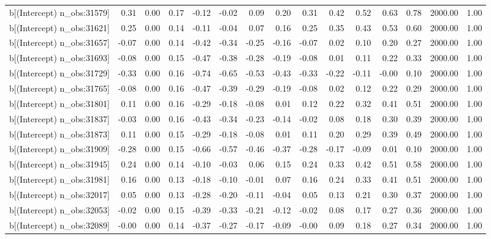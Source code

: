 \begin{table}[ht]
\begin{tabular}{rrrrrrrrrrrrrrr}
  b[(Intercept) n\_obs:31579] & 0.31 & 0.00 & 0.17 & -0.12 & -0.02 & 0.09 & 0.20 & 0.31 & 0.42 & 0.52 & 0.63 & 0.78 & 2000.00 & 1.00 \\ 
  b[(Intercept) n\_obs:31621] & 0.25 & 0.00 & 0.14 & -0.11 & -0.04 & 0.07 & 0.16 & 0.25 & 0.35 & 0.43 & 0.53 & 0.60 & 2000.00 & 1.00 \\ 
  b[(Intercept) n\_obs:31657] & -0.07 & 0.00 & 0.14 & -0.42 & -0.34 & -0.25 & -0.16 & -0.07 & 0.02 & 0.10 & 0.20 & 0.27 & 2000.00 & 1.00 \\ 
  b[(Intercept) n\_obs:31693] & -0.08 & 0.00 & 0.15 & -0.47 & -0.38 & -0.28 & -0.19 & -0.08 & 0.01 & 0.11 & 0.22 & 0.33 & 2000.00 & 1.00 \\ 
  b[(Intercept) n\_obs:31729] & -0.33 & 0.00 & 0.16 & -0.74 & -0.65 & -0.53 & -0.43 & -0.33 & -0.22 & -0.11 & -0.00 & 0.10 & 2000.00 & 1.00 \\ 
  b[(Intercept) n\_obs:31765] & -0.08 & 0.00 & 0.16 & -0.47 & -0.39 & -0.29 & -0.19 & -0.08 & 0.02 & 0.12 & 0.22 & 0.29 & 2000.00 & 1.00 \\ 
  b[(Intercept) n\_obs:31801] & 0.11 & 0.00 & 0.16 & -0.29 & -0.18 & -0.08 & 0.01 & 0.12 & 0.22 & 0.32 & 0.41 & 0.51 & 2000.00 & 1.00 \\ 
  b[(Intercept) n\_obs:31837] & -0.03 & 0.00 & 0.16 & -0.43 & -0.34 & -0.23 & -0.14 & -0.02 & 0.08 & 0.18 & 0.30 & 0.39 & 2000.00 & 1.00 \\ 
  b[(Intercept) n\_obs:31873] & 0.11 & 0.00 & 0.15 & -0.29 & -0.18 & -0.08 & 0.01 & 0.11 & 0.20 & 0.29 & 0.39 & 0.49 & 2000.00 & 1.00 \\ 
  b[(Intercept) n\_obs:31909] & -0.28 & 0.00 & 0.15 & -0.66 & -0.57 & -0.46 & -0.37 & -0.28 & -0.17 & -0.09 & 0.01 & 0.10 & 2000.00 & 1.00 \\ 
  b[(Intercept) n\_obs:31945] & 0.24 & 0.00 & 0.14 & -0.10 & -0.03 & 0.06 & 0.15 & 0.24 & 0.33 & 0.42 & 0.51 & 0.58 & 2000.00 & 1.00 \\ 
  b[(Intercept) n\_obs:31981] & 0.16 & 0.00 & 0.13 & -0.18 & -0.10 & -0.01 & 0.07 & 0.16 & 0.24 & 0.33 & 0.41 & 0.51 & 2000.00 & 1.00 \\ 
  b[(Intercept) n\_obs:32017] & 0.05 & 0.00 & 0.13 & -0.28 & -0.20 & -0.11 & -0.04 & 0.05 & 0.13 & 0.21 & 0.30 & 0.37 & 2000.00 & 1.00 \\ 
  b[(Intercept) n\_obs:32053] & -0.02 & 0.00 & 0.15 & -0.39 & -0.33 & -0.21 & -0.12 & -0.02 & 0.08 & 0.17 & 0.27 & 0.36 & 2000.00 & 1.00 \\ 
  b[(Intercept) n\_obs:32089] & -0.00 & 0.00 & 0.14 & -0.37 & -0.27 & -0.17 & -0.09 & -0.00 & 0.09 & 0.18 & 0.27 & 0.34 & 2000.00 & 1.00 \\ 

\end{tabular}
\end{table}
